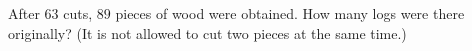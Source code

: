 After $63$ cuts, $89$ pieces of wood were obtained. How many logs were there originally? (It is not allowed to cut two pieces at the same time.)
